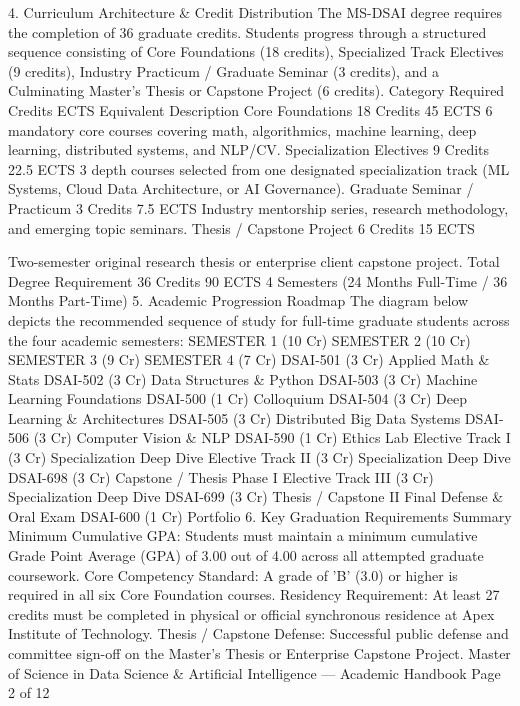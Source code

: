 4. Curriculum Architecture \& Credit Distribution
The MS-DSAI degree requires the completion of 36 graduate credits. Students progress through a structured
sequence consisting of Core Foundations (18 credits), Specialized Track Electives (9 credits), Industry Practicum /
Graduate Seminar (3 credits), and a Culminating Master's Thesis or Capstone Project (6 credits).
Category
Required
Credits
ECTS
Equivalent
Description
Core Foundations
18 Credits
45 ECTS
6 mandatory core courses covering math, algorithmics, machine
learning, deep learning, distributed systems, and NLP/CV.
Specialization
Electives
9 Credits
22.5 ECTS
3 depth courses selected from one designated specialization track
(ML Systems, Cloud Data Architecture, or AI Governance).
Graduate Seminar /
Practicum
3 Credits
7.5 ECTS
Industry mentorship series, research methodology, and emerging
topic seminars.
Thesis / Capstone
Project
6 Credits
15 ECTS

Two-semester original research thesis or enterprise client capstone
project.
Total Degree
Requirement
36 Credits
90 ECTS
4 Semesters (24 Months Full-Time / 36 Months Part-Time)
5. Academic Progression Roadmap
The diagram below depicts the recommended sequence of study for full-time graduate students across the four
academic semesters:
SEMESTER 1 (10 Cr)
SEMESTER 2 (10 Cr)
SEMESTER 3 (9 Cr)
SEMESTER 4 (7 Cr)
DSAI-501 (3 Cr)
Applied Math \& Stats
DSAI-502 (3 Cr)
Data Structures \& Python
DSAI-503 (3 Cr)
Machine Learning Foundations
DSAI-500 (1 Cr) Colloquium
DSAI-504 (3 Cr)
Deep Learning \& Architectures
DSAI-505 (3 Cr)
Distributed Big Data Systems
DSAI-506 (3 Cr)
Computer Vision \& NLP
DSAI-590 (1 Cr) Ethics Lab
Elective Track I (3 Cr)
Specialization Deep Dive
Elective Track II (3 Cr)
Specialization Deep Dive
DSAI-698 (3 Cr)
Capstone / Thesis Phase I
Elective Track III (3 Cr)
Specialization Deep Dive
DSAI-699 (3 Cr)
Thesis / Capstone II
Final Defense \& Oral Exam
DSAI-600 (1 Cr) Portfolio
6. Key Graduation Requirements Summary
Minimum Cumulative GPA: Students must maintain a minimum cumulative Grade Point Average (GPA) of 3.00 out of
4.00 across all attempted graduate coursework.
Core Competency Standard: A grade of 'B' (3.0) or higher is required in all six Core Foundation courses.
Residency Requirement: At least 27 credits must be completed in physical or official synchronous residence at Apex
Institute of Technology.
Thesis / Capstone Defense: Successful public defense and committee sign-off on the Master's Thesis or Enterprise
Capstone Project.
Master of Science in Data Science \& Artificial Intelligence — Academic Handbook
Page 2 of 12

